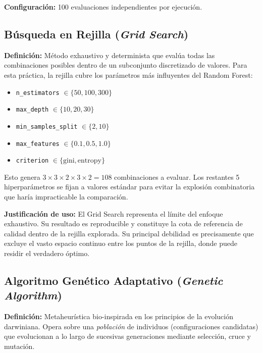 \documentclass[12pt, a4paper]{article}
\begin{document}
\textbf{Configuración:} 100 evaluaciones independientes por ejecución.

\subsection{Búsqueda en Rejilla (\textit{Grid Search})}

\textbf{Definición:} Método exhaustivo y determinista que evalúa todas las combinaciones
posibles dentro de un subconjunto discretizado de valores. Para esta práctica, la rejilla
cubre los parámetros más influyentes del Random Forest:

\begin{itemize}[itemsep=0.2em]
  \item \texttt{n\_estimators} $\in \{50, 100, 300\}$
  \item \texttt{max\_depth} $\in \{10, 20, 30\}$
  \item \texttt{min\_samples\_split} $\in \{2, 10\}$
  \item \texttt{max\_features} $\in \{0.1, 0.5, 1.0\}$
  \item \texttt{criterion} $\in \{\text{gini}, \text{entropy}\}$
\end{itemize}

Esto genera $3 \times 3 \times 2 \times 3 \times 2 = 108$ combinaciones a evaluar. Los
restantes 5 hiperparámetros se fijan a valores estándar para evitar la explosión
combinatoria que haría impracticable la comparación.

\textbf{Justificación de uso:} El Grid Search representa el límite del enfoque
exhaustivo. Su resultado es reproducible y constituye la cota de referencia de calidad
dentro de la rejilla explorada. Su principal debilidad es precisamente que excluye el
vasto espacio continuo entre los puntos de la rejilla, donde puede residir el verdadero
óptimo.

\subsection{Algoritmo Genético Adaptativo (\textit{Genetic Algorithm})}

\textbf{Definición:} Metaheurística bio-inspirada en los principios de la evolución
darwiniana. Opera sobre una \textit{población} de individuos (configuraciones candidatas)
que evolucionan a lo largo de sucesivas generaciones mediante selección, cruce y mutación.
\end{document}
